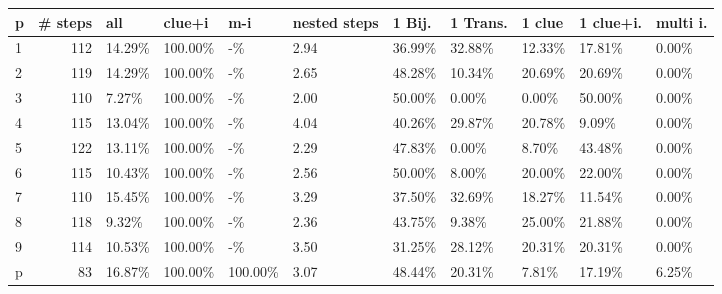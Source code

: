 \begin{tabular}{lrlllllllll}
\toprule
 p &  \# steps &     all &  clue+i  &      m-i & nested steps &  1 Bij. & 1 Trans. &  1 clue & 1 clue+i. & multi i. \\
\midrule
 1 &      112 &  14.29\% &  100.00\% &       -\% &         2.94 &  36.99\% &   32.88\% &  12.33\% &    17.81\% &    0.00\% \\
 2 &      119 &  14.29\% &  100.00\% &       -\% &         2.65 &  48.28\% &   10.34\% &  20.69\% &    20.69\% &    0.00\% \\
 3 &      110 &   7.27\% &  100.00\% &       -\% &         2.00 &  50.00\% &    0.00\% &   0.00\% &    50.00\% &    0.00\% \\
 4 &      115 &  13.04\% &  100.00\% &       -\% &         4.04 &  40.26\% &   29.87\% &  20.78\% &     9.09\% &    0.00\% \\
 5 &      122 &  13.11\% &  100.00\% &       -\% &         2.29 &  47.83\% &    0.00\% &   8.70\% &    43.48\% &    0.00\% \\
 6 &      115 &  10.43\% &  100.00\% &       -\% &         2.56 &  50.00\% &    8.00\% &  20.00\% &    22.00\% &    0.00\% \\
 7 &      110 &  15.45\% &  100.00\% &       -\% &         3.29 &  37.50\% &   32.69\% &  18.27\% &    11.54\% &    0.00\% \\
 8 &      118 &   9.32\% &  100.00\% &       -\% &         2.36 &  43.75\% &    9.38\% &  25.00\% &    21.88\% &    0.00\% \\
 9 &      114 &  10.53\% &  100.00\% &       -\% &         3.50 &  31.25\% &   28.12\% &  20.31\% &    20.31\% &    0.00\% \\
 p &       83 &  16.87\% &  100.00\% &  100.00\% &         3.07 &  48.44\% &   20.31\% &   7.81\% &    17.19\% &    6.25\% \\
\bottomrule
\end{tabular}
